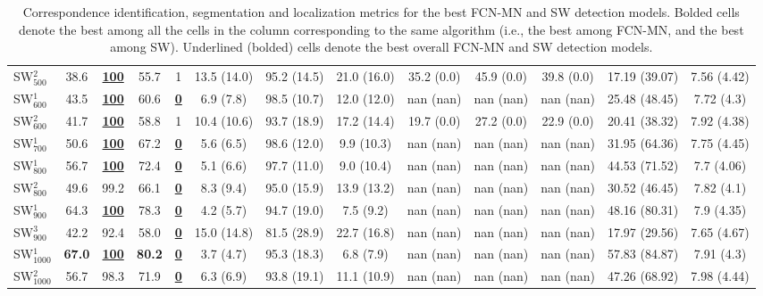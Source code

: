 \documentclass[a4paper,authoryear,review]{elsarticle}
\begin{document}
\begin{table}[]
\begin{adjustbox}{angle=90}
{\begin{tabular}{lcccccccccccc}
                SW$_{500}^{2}$ & 38.6 & {\ul \textbf{100}} & 55.7 & 1 & 13.5 (14.0) & 95.2 (14.5) & 21.0 (16.0) & 35.2 (0.0) & 45.9 (0.0) & 39.8 (0.0) & 17.19 (39.07) & 7.56 (4.42) \\
                SW$_{600}^{1}$ & 43.5 & {\ul \textbf{100}} & 60.6 & {\ul \textbf{0}} & 6.9 (7.8) & 98.5 (10.7) & 12.0 (12.0) & nan (nan) & nan (nan) & nan (nan) & 25.48 (48.45) & 7.72 (4.3) \\
                SW$_{600}^{2}$ & 41.7 & {\ul \textbf{100}} & 58.8 & 1 & 10.4 (10.6) & 93.7 (18.9) & 17.2 (14.4) & 19.7 (0.0) & 27.2 (0.0) & 22.9 (0.0) & 20.41 (38.32) & 7.92 (4.38) \\
                SW$_{700}^{1}$ & 50.6 & {\ul \textbf{100}} & 67.2 & {\ul \textbf{0}} & 5.6 (6.5) & 98.6 (12.0) & 9.9 (10.3) & nan (nan) & nan (nan) & nan (nan) & 31.95 (64.36) & 7.75 (4.45) \\
                SW$_{800}^{1}$ & 56.7 & {\ul \textbf{100}} & 72.4 & {\ul \textbf{0}} & 5.1 (6.6) & 97.7 (11.0) & 9.0 (10.4) & nan (nan) & nan (nan) & nan (nan) & 44.53 (71.52) & 7.7 (4.06) \\
                SW$_{800}^{2}$ & 49.6 & 99.2 & 66.1 & {\ul \textbf{0}} & 8.3 (9.4) & 95.0 (15.9) & 13.9 (13.2) & nan (nan) & nan (nan) & nan (nan) & 30.52 (46.45) & 7.82 (4.1) \\
                SW$_{900}^{1}$ & 64.3 & {\ul \textbf{100}} & 78.3 & {\ul \textbf{0}} & 4.2 (5.7) & 94.7 (19.0) & 7.5 (9.2) & nan (nan) & nan (nan) & nan (nan) & 48.16 (80.31) & 7.9 (4.35) \\
                SW$_{900}^{3}$ & 42.2 & 92.4 & 58.0 & {\ul \textbf{0}} & 15.0 (14.8) & 81.5 (28.9) & 22.7 (16.8) & nan (nan) & nan (nan) & nan (nan) & 17.97 (29.56) & 7.65 (4.67) \\
                SW$_{1000}^{1}$ & \textbf{67.0} & {\ul \textbf{100}} & \textbf{80.2} & {\ul \textbf{0}} & 3.7 (4.7) & 95.3 (18.3) & 6.8 (7.9) & nan (nan) & nan (nan) & nan (nan) & 57.83 (84.87) & 7.91 (4.3) \\
                SW$_{1000}^{2}$ & 56.7 & 98.3 & 71.9 & {\ul \textbf{0}} & 6.3 (6.9) & 93.8 (19.1) & 11.1 (10.9) & nan (nan) & nan (nan) & nan (nan) & 47.26 (68.92) & 7.98 (4.44) \\ \hline
            \end{tabular}
        }
    \end{adjustbox}
    \caption{Correspondence identification, segmentation and localization metrics for the best FCN-MN and SW detection models. Bolded cells denote the best among all the cells in the column corresponding to the same algorithm (i.e., the best among FCN-MN, and the best among SW). Underlined (bolded) cells denote the best overall FCN-MN and SW detection models.}        
        \label{tab:TablaXX}
    \end{table}
\end{document}
